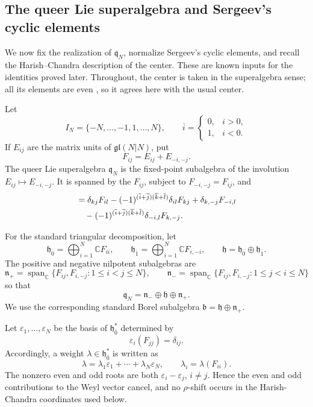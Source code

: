 \documentclass[11pt]{amsart}
\numberwithin{equation}{section}
\theoremstyle{definition}
\theoremstyle{remark}
\newcommand{\C}{\mathbb C}
\newcommand{\gl}{\mathfrak{gl}}
\newcommand{\q}{\mathfrak q}
\newcommand{\bars}[1]{\overline{#1}}
\begin{document}
\subsection{The queer Lie superalgebra and Sergeev's cyclic elements}
\label{sec:cyclic}

We now fix the realization of \(\q_N\), normalize Sergeev's cyclic
elements, and recall the Harish--Chandra description of the center.
These are known inputs for the identities proved later.  Throughout,
the center is taken in the superalgebra sense; all its elements are even
\cite[Section~1]{NazarovSergeev2006}, so it agrees here with the usual
center.

Let
\[
 I_N=\{-N,\ldots,-1,1,\ldots,N\},
 \qquad
 \bars i=\begin{cases}0,&i>0,\\1,&i<0.\end{cases}
\]
If \(E_{ij}\) are the matrix units of \(\gl(N|N)\), put
\[
 F_{ij}=E_{ij}+E_{-i,-j}.
\]
The queer Lie superalgebra \(\q_N\) is the fixed-point subalgebra of
the involution \(E_{ij}\mapsto E_{-i,-j}\).  It is spanned by the
\(F_{ij}\), subject to \(F_{-i,-j}=F_{ij}\), and
\begin{align}
 [F_{ij},F_{kl}]
 &=\delta_{kj}F_{il}
 -(-1)^{(\bars i+\bars j)(\bars k+\bars l)}\delta_{il}F_{kj}
 +\delta_{k,-j}F_{-i,l}\notag\\
 &\quad
 -(-1)^{(\bars i+\bars j)(\bars k+\bars l)}
  \delta_{-i,l}F_{k,-j}.
 \label{eq:q-bracket}
\end{align}

For the standard triangular decomposition, let
\[
 \mathfrak h_{\bar 0}
 =\bigoplus_{i=1}^N\C F_{ii},
 \qquad
 \mathfrak h_{\bar 1}
 =\bigoplus_{i=1}^N\C F_{i,-i},
 \qquad
 \mathfrak h=\mathfrak h_{\bar0}\oplus\mathfrak h_{\bar1}.
\]
The positive and negative nilpotent subalgebras are \[\mathfrak n_+
 =
 \operatorname{span}_{\C}
 \{F_{ij},F_{i,-j}:1\leq i<j\leq N\},
\qquad
\mathfrak n_-
 =
 \operatorname{span}_{\C}
 \{F_{ij},F_{i,-j}:1\leq j<i\leq N\}\]
so that
\[
 \mathfrak q_N
 =\mathfrak n_-\oplus\mathfrak h\oplus\mathfrak n_+.
\]
We use the corresponding standard Borel subalgebra
\(\mathfrak b=\mathfrak h\oplus\mathfrak n_+\).

Let \(\varepsilon_1,\ldots,\varepsilon_N\) be the basis of
\(\mathfrak h_{\bar0}^*\) determined by
\[
 \varepsilon_i(F_{jj})=\delta_{ij}.
\]
Accordingly, a weight
\(\lambda\in\mathfrak h_{\bar0}^*\) is written as
\[
 \lambda=\lambda_1\varepsilon_1+\cdots+\lambda_N\varepsilon_N,
 \qquad
 \lambda_i=\lambda(F_{ii}).
\]
The nonzero even and odd roots are both
\(\varepsilon_i-\varepsilon_j\), \(i\neq j\).  Hence the even and odd
contributions to the Weyl vector cancel, and no \(\rho\)-shift occurs
in the Harish-Chandra coordinates used below.
\end{document}

